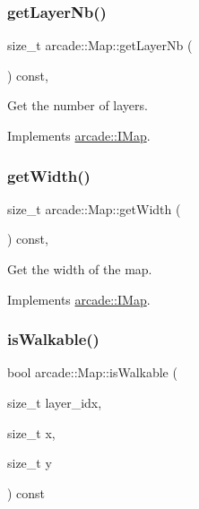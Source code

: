 \mbox{\label{classarcade_1_1_map_a75d832d23939401ffe062b461839bc8d}} 
\subsubsection{\texorpdfstring{get\+Layer\+Nb()}{getLayerNb()}}
{\footnotesize\ttfamily size\+\_\+t arcade\+::\+Map\+::get\+Layer\+Nb (\begin{DoxyParamCaption}{ }\end{DoxyParamCaption}) const\hspace{0.3cm}{\ttfamily [override]}, {\ttfamily [virtual]}}



Get the number of layers. 



Implements \hyperlink{classarcade_1_1_i_map_a3e5fc4c5286f92fb49c8c7d0e79f4510}{arcade\+::\+I\+Map}.

\mbox{\label{classarcade_1_1_map_af48996ef9fc333a7c9ab6a9f2ddb7b56}} 
\subsubsection{\texorpdfstring{get\+Width()}{getWidth()}}
{\footnotesize\ttfamily size\+\_\+t arcade\+::\+Map\+::get\+Width (\begin{DoxyParamCaption}{ }\end{DoxyParamCaption}) const\hspace{0.3cm}{\ttfamily [override]}, {\ttfamily [virtual]}}



Get the width of the map. 



Implements \hyperlink{classarcade_1_1_i_map_a6e7534eeff05277f1429037f8b01e25f}{arcade\+::\+I\+Map}.

\mbox{\label{classarcade_1_1_map_a928573e629508a21455fdddf7298bcb4}} 
\subsubsection{\texorpdfstring{is\+Walkable()}{isWalkable()}}
{\footnotesize\ttfamily bool arcade\+::\+Map\+::is\+Walkable (\begin{DoxyParamCaption}\item[{size\+\_\+t}]{layer\+\_\+idx,  }\item[{size\+\_\+t}]{x,  }\item[{size\+\_\+t}]{y }\end{DoxyParamCaption}) const}

